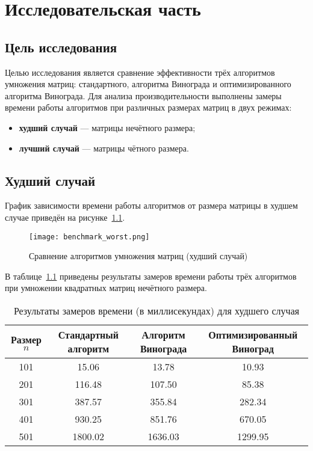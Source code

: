 \chapter{Исследовательская часть}

\section{Цель исследования}

Целью исследования является сравнение эффективности трёх алгоритмов умножения матриц: стандартного, алгоритма Винограда и оптимизированного алгоритма Винограда.  
Для анализа производительности выполнены замеры времени работы алгоритмов при различных размерах матриц в двух режимах:
\begin{itemize}
	\item \textbf{худший случай} — матрицы нечётного размера;
	\item \textbf{лучший случай} — матрицы чётного размера.
\end{itemize}

\section{Худший случай}

График зависимости времени работы алгоритмов от размера матрицы в худшем случае приведён на рисунке~\ref{fig:worst}.

\begin{figure}[H]
	\centering
	\texttt{[image: benchmark\_worst.png]}
	\caption{Сравнение алгоритмов умножения матриц (худший случай)}
	\label{fig:worst}
\end{figure}

В таблице~\ref{tab:worst} приведены результаты замеров времени работы трёх алгоритмов при умножении квадратных матриц нечётного размера.

\begin{table}[H]
	\centering
	\caption{Результаты замеров времени (в миллисекундах) для худшего случая}
	\label{tab:worst}
	\begin{tabular}{|c|c|c|c|}
		\hline
		Размер $n$ & Стандартный алгоритм & Алгоритм Винограда & Оптимизированный Виноград \\
		\hline
		101 & 15.06 & 13.78 & 10.93 \\
		201 & 116.48 & 107.50 & 85.38 \\
		301 & 387.57 & 355.84 & 282.34 \\
		401 & 930.25 & 851.76 & 670.05 \\
		501 & 1800.02 & 1636.03 & 1299.95 \\
		\hline
	\end{tabular}
\end{table}

